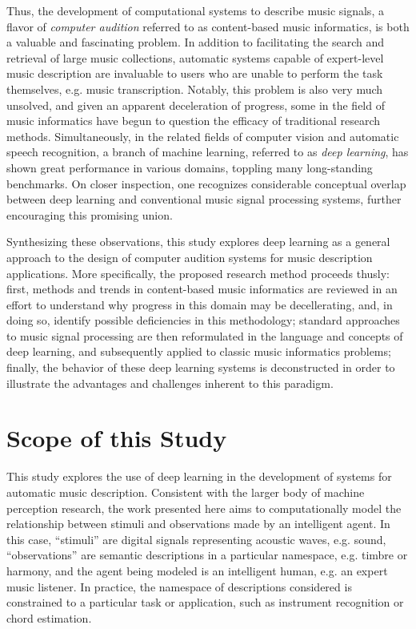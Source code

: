 Thus, the development of computational systems to describe music signals, a flavor of \emph{computer audition} referred to as content-based music informatics, is both a valuable and fascinating problem.
In addition to facilitating the search and retrieval of large music collections, automatic systems capable of expert-level music description are invaluable to users who are unable to perform the task themselves, e.g. music transcription.
Notably, this problem is also very much unsolved, and given an apparent deceleration of progress, some in the field of music informatics have begun to question the efficacy of traditional research methods.
Simultaneously, in the related fields of computer vision and automatic speech recognition, a branch of machine learning, referred to as \emph{deep learning}, has shown great performance in various domains, toppling many long-standing benchmarks.
On closer inspection, one recognizes considerable conceptual overlap between deep learning and conventional music signal processing systems, further encouraging this promising union.

Synthesizing these observations, this study explores deep learning as a general approach to the design of computer audition systems for music description applications.
More specifically, the proposed research method proceeds thusly:
first, methods and trends in content-based music informatics are reviewed in an effort to understand why progress in this domain may be decellerating, and, in doing so, identify possible deficiencies in this methodology;
standard approaches to music signal processing are then reformulated in the language and concepts of deep learning, and subsequently applied to classic music informatics problems;
finally, the behavior of these deep learning systems is deconstructed in order to illustrate the advantages and challenges inherent to this paradigm.


\section{Scope of this Study}
\label{sec:scope}


This study explores the use of deep learning in the development of systems for automatic music description.
Consistent with the larger body of machine perception research, the work presented here aims to computationally model the relationship between stimuli and observations made by an intelligent agent.
In this case, ``stimuli'' are digital signals representing acoustic waves, e.g. sound, ``observations'' are semantic descriptions in a particular namespace, e.g. timbre or harmony, and the agent being modeled is an intelligent human, e.g. an expert music listener.
In practice, the namespace of descriptions considered is constrained to a particular task or application, such as instrument recognition or chord estimation.

